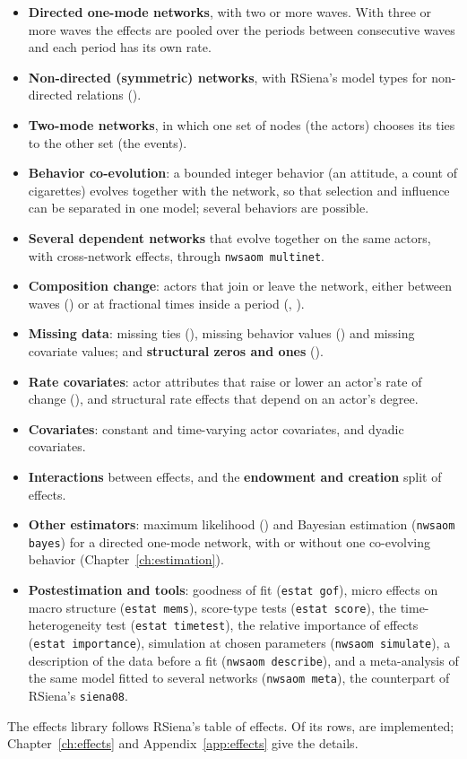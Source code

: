 \begin{itemize}[nosep]
  \item \textbf{Directed one-mode networks}, with two or more waves. With three or more waves the effects are pooled over the periods between consecutive waves and each period has its own rate.
  \item \textbf{Non-directed (symmetric) networks}, with RSiena's model types for non-directed relations ().
  \item \textbf{Two-mode networks}, in which one set of nodes (the actors) chooses its ties to the other set (the events).
  \item \textbf{Behavior co-evolution}: a bounded integer behavior (an attitude, a count of cigarettes) evolves together with the network, so that selection and influence can be separated in one model; several behaviors are possible.
  \item \textbf{Several dependent networks} that evolve together on the same actors, with cross-network effects, through \texttt{nwsaom multinet}.
  \item \textbf{Composition change}: actors that join or leave the network, either between waves () or at fractional times inside a period (, ).
  \item \textbf{Missing data}: missing ties (), missing behavior values () and missing covariate values; and \textbf{structural zeros and ones} ().
  \item \textbf{Rate covariates}: actor attributes that raise or lower an actor's rate of change (), and structural rate effects that depend on an actor's degree.
  \item \textbf{Covariates}: constant and time-varying actor covariates, and dyadic covariates.
  \item \textbf{Interactions} between effects, and the \textbf{endowment and creation} split of effects.
  \item \textbf{Other estimators}: maximum likelihood () and Bayesian estimation (\texttt{nwsaom bayes}) for a directed one-mode network, with or without one co-evolving behavior (Chapter~\ref{ch:estimation}).
  \item \textbf{Postestimation and tools}: goodness of fit (\texttt{estat gof}), micro effects on macro structure (\texttt{estat mems}), score-type tests (\texttt{estat score}), the time-heterogeneity test (\texttt{estat timetest}), the relative importance of effects (\texttt{estat importance}), simulation at chosen parameters (\texttt{nwsaom simulate}), a description of the data before a fit (\texttt{nwsaom describe}), and a meta-analysis of the same model fitted to several networks (\texttt{nwsaom meta}), the counterpart of RSiena's \texttt{siena08}.
\end{itemize}
The effects library follows RSiena's table of effects. Of its \nTotal{} rows, \nImpl{} are implemented; Chapter~\ref{ch:effects} and Appendix~\ref{app:effects} give the details.

